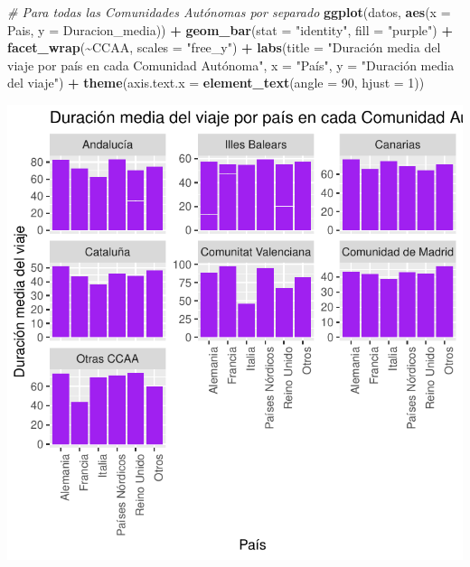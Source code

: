 \documentclass[data,article,submit,moreauthors,pdftex]{Definitions/mdpi}
\newenvironment{Shaded}{\begin{snugshade}}{\end{snugshade}}
\newcommand{\AttributeTok}[1]{\textcolor[rgb]{0.13,0.29,0.53}{#1}}
\newcommand{\CommentTok}[1]{\textcolor[rgb]{0.56,0.35,0.01}{\textit{#1}}}
\newcommand{\DecValTok}[1]{\textcolor[rgb]{0.00,0.00,0.81}{#1}}
\newcommand{\FunctionTok}[1]{\textcolor[rgb]{0.13,0.29,0.53}{\textbf{#1}}}
\newcommand{\NormalTok}[1]{#1}
\newcommand{\SpecialCharTok}[1]{\textcolor[rgb]{0.81,0.36,0.00}{\textbf{#1}}}
\newcommand{\StringTok}[1]{\textcolor[rgb]{0.31,0.60,0.02}{#1}}
\begin{document}
\begin{Shaded}
\begin{Highlighting}[]
\CommentTok{\# Para todas las Comunidades Autónomas por separado}
\FunctionTok{ggplot}\NormalTok{(datos, }\FunctionTok{aes}\NormalTok{(}\AttributeTok{x =}\NormalTok{ Pais, }\AttributeTok{y =}\NormalTok{ Duracion\_media)) }\SpecialCharTok{+} \FunctionTok{geom\_bar}\NormalTok{(}\AttributeTok{stat =} \StringTok{"identity"}\NormalTok{,}
    \AttributeTok{fill =} \StringTok{"purple"}\NormalTok{) }\SpecialCharTok{+} \FunctionTok{facet\_wrap}\NormalTok{(}\SpecialCharTok{\textasciitilde{}}\NormalTok{CCAA, }\AttributeTok{scales =} \StringTok{"free\_y"}\NormalTok{) }\SpecialCharTok{+}
    \FunctionTok{labs}\NormalTok{(}\AttributeTok{title =} \StringTok{"Duración media del viaje por país en cada Comunidad Autónoma"}\NormalTok{,}
        \AttributeTok{x =} \StringTok{"País"}\NormalTok{, }\AttributeTok{y =} \StringTok{"Duración media del viaje"}\NormalTok{) }\SpecialCharTok{+} \FunctionTok{theme}\NormalTok{(}\AttributeTok{axis.text.x =} \FunctionTok{element\_text}\NormalTok{(}\AttributeTok{angle =} \DecValTok{90}\NormalTok{,}
    \AttributeTok{hjust =} \DecValTok{1}\NormalTok{))}
\end{Highlighting}
\end{Shaded}

\includegraphics{ProyectoAED2024_Rmd_files/figure-latex/unnamed-chunk-23-1.pdf}
\end{document}
